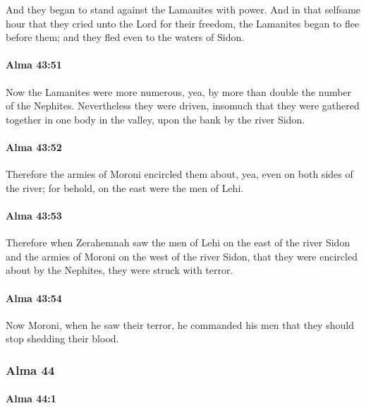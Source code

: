 			And they began to stand against the Lamanites with power.
			And in that selfsame hour that they cried unto the Lord for their freedom,
			the Lamanites began to flee before them;
			and they fled even to the waters of Sidon.

		\paragraph{Alma 43:51} %
			\label{ALMA-43-51}

			Now the Lamanites were more numerous,
			yea, by more than double the number of the Nephites.
			Nevertheless they were driven,
			insomuch that they were gathered together in one body in the valley,
			upon the bank by the river Sidon.

		\paragraph{Alma 43:52} %
			\label{ALMA-43-52}

			Therefore the armies of Moroni encircled them about,
			yea, even on both sides of the river;
			for behold, on the east were the men of Lehi.

		\paragraph{Alma 43:53} %
			\label{ALMA-43-53}

			Therefore when Zerahemnah saw the men of Lehi on the east of the river Sidon
			and the armies of Moroni on the west of the river Sidon,
			that they were encircled about by the Nephites,
			they were struck with terror.

		\paragraph{Alma 43:54} %
			\label{ALMA-43-54}

			Now Moroni, when he saw their terror,
			he commanded his men that they should stop shedding their blood.

	\subsubsection{Alma 44} %
		\label{ALMA-44}
		
		\paragraph{Alma 44:1} %
			\label{ALMA-44-1}

